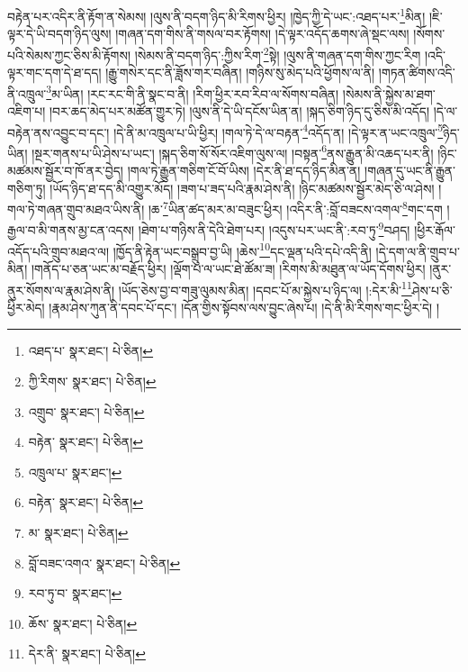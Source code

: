 བརྟེན་པར་འདིར་ནི་རྟོག་ན་སེམས། །ལུས་ནི་བདག་ཉིད་མི་རིགས་ཕྱིར། །ཁྱེད་ཀྱི་དེ་ཡང་:འཐད་པར་\footnote{འཐད་པ་  སྣར་ཐང་།  པེ་ཅིན། }མིན། །ཇི་ལྟར་དེ་ཡི་བདག་ཉིད་ལུས། །གཞན་དག་གིས་ནི་གསལ་བར་རྟོགས། །དེ་ལྟར་འདོད་ཆགས་ཞེ་སྡང་ལས། །སོགས་པའི་སེམས་ཀྱང་ཅིས་མི་རྟོགས། །སེམས་ནི་བདག་ཉིད་:ཀྱིས་རིག་\footnote{ཀྱི་རིགས་  སྣར་ཐང་།  པེ་ཅིན། }སྟེ། །ལུས་ནི་གཞན་དག་གིས་ཀྱང་རིག །འདི་ལྟར་གང་དག་དེ་ཐ་དད། །རྒྱུ་གསེར་དང་ནི་ཟློས་གར་བཞིན། །གཉིས་སུ་མེད་པའི་ཕྱོགས་ལ་ནི། །གཏན་ཚིགས་འདི་ནི་འཁྲུལ་\footnote{འགྲུབ་  སྣར་ཐང་།  པེ་ཅིན། }མ་ཡིན། །རང་རང་གི་ནི་སྣང་བ་ནི། །རིག་ཕྱིར་རབ་རིབ་ལ་སོགས་བཞིན། །སེམས་ནི་སྐྱེས་མ་ཐག་འཇིག་པ། །བར་ཆད་མེད་པར་མཚོན་གྱུར་ཏེ། །ལུས་ནི་དེ་ཡི་དངོས་ཡིན་ན། །སྐད་ཅིག་ཉིད་དུ་ཅིས་མི་འདོད། །དེ་ལ་བརྟེན་ནས་འབྱུང་བ་དང་། །དེ་ནི་མ་འཁྲུལ་པ་ཡི་ཕྱིར། །གལ་ཏེ་དེ་ལ་བརྟན་\footnote{བརྟེན་  སྣར་ཐང་།  པེ་ཅིན། }འདོད་ན། །དེ་ལྟར་ན་ཡང་འཁྲུལ་\footnote{འཁྲུལ་པ་  སྣར་ཐང་། }ཉིད་ཡིན། །སྔར་གནས་པ་ཡི་ཤེས་པ་ཡང་། །སྐད་ཅིག་སོ་སོར་འཇིག་ལུས་ལ། །བསྟན་\footnote{བརྟེན་  སྣར་ཐང་།  པེ་ཅིན། }ནས་རྒྱུན་མི་འཆད་པར་ནི། །ཉིང་མཚམས་སྦྱོར་བ་ཁོ་ནར་བྱེད། །གལ་ཏེ་རྒྱུན་གཅིག་ངོ་བོ་ཡིས། །དེར་ནི་ཐ་དད་ཉིད་མིན་ན། །གཞན་དུ་ཡང་ནི་རྒྱུན་གཅིག་ཏུ། །ཡོད་ཉིད་ཐ་དད་མི་འགྱུར་མོད། །ཟག་པ་ཟད་པའི་རྣམ་ཤེས་ནི། །ཉིང་མཚམས་སྦྱོར་མེད་ཅི་ལ་ཤེས། །གལ་ཏེ་གཞན་གྲུབ་མཐའ་ཡིས་ནི། །ཆ་\footnote{མ་  སྣར་ཐང་།  པེ་ཅིན། }ཡིན་ཚད་མར་མ་བཟུང་ཕྱིར། །འདིར་ནི་:བློ་བཟངས་འགལ་\footnote{བློ་བཟང་འགའ་  སྣར་ཐང་།  པེ་ཅིན། }གང་དག །རྒྱལ་བ་མི་གནས་མྱ་ངན་འདས། །ཐེག་པ་གཉིས་ནི་དེའི་ཐེག་པར། །འདུས་པར་ཡང་ནི་:རབ་ཏུ་\footnote{རབ་ཏུ་བ་  སྣར་ཐང་། }བཤད། །ཕྱིར་རྒོལ་འདོད་པའི་གྲུབ་མཐའ་ལ། །ཁྱོད་ནི་རྟེན་ཡང་བསྒྲུབ་བྱ་ཡི། །ཆེས་\footnote{ཆོས་  སྣར་ཐང་།  པེ་ཅིན། }དང་ལྡན་པའི་དཔེ་འདི་ནི། །དེ་དག་ལ་ནི་གྲུབ་པ་མིན། །གནོད་པ་ཅན་ཡང་མ་བརྗོད་ཕྱིར། །ལྡོག་པ་ལ་ཡང་ཐེ་ཚོམ་ཟ། །རིགས་མི་མཐུན་ལ་ཡོད་དོགས་ཕྱིར། །ནུར་ནུར་སོགས་ལ་རྣམ་ཤེས་ནི། །ཡོད་ཅེས་བྱ་བ་གཟུ་ལུམས་མིན། །དབང་པོ་མ་སྐྱེས་པ་ཉིད་ལ། །:དེར་མི་\footnote{དེར་ནི་  སྣར་ཐང་།  པེ་ཅིན། }ཤེས་པ་ཅི་ཕྱིར་མེད། །རྣམ་ཤེས་ཀུན་ནི་དབང་པོ་དང་། །དོན་གྱིས་སྟོབས་ལས་བྱུང་ཞེས་པ། །དེ་ནི་མི་རིགས་གང་ཕྱིར་དེ། །
